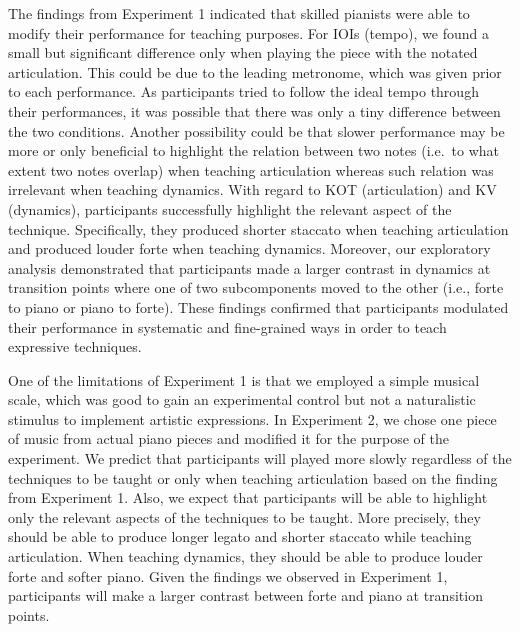\documentclass[
  english,
  man,floatsintext]{apa6}
\begin{document}
The findings from Experiment 1 indicated that skilled pianists were able to modify their performance for teaching purposes. For IOIs (tempo), we found a small but significant difference only when playing the piece with the notated articulation. This could be due to the leading metronome, which was given prior to each performance. As participants tried to follow the ideal tempo through their performances, it was possible that there was only a tiny difference between the two conditions. Another possibility could be that slower performance may be more or only beneficial to highlight the relation between two notes (i.e.~to what extent two notes overlap) when teaching articulation whereas such relation was irrelevant when teaching dynamics. With regard to KOT (articulation) and KV (dynamics), participants successfully highlight the relevant aspect of the technique. Specifically, they produced shorter staccato when teaching articulation and produced louder forte when teaching dynamics. Moreover, our exploratory analysis demonstrated that participants made a larger contrast in dynamics at transition points where one of two subcomponents moved to the other (i.e., forte to piano or piano to forte). These findings confirmed that participants modulated their performance in systematic and fine-grained ways in order to teach expressive techniques.

One of the limitations of Experiment 1 is that we employed a simple musical scale, which was good to gain an experimental control but not a naturalistic stimulus to implement artistic expressions. In Experiment 2, we chose one piece of music from actual piano pieces and modified it for the purpose of the experiment. We predict that participants will played more slowly regardless of the techniques to be taught or only when teaching articulation based on the finding from Experiment 1. Also, we expect that participants will be able to highlight only the relevant aspects of the techniques to be taught. More precisely, they should be able to produce longer legato and shorter staccato while teaching articulation. When teaching dynamics, they should be able to produce louder forte and softer piano. Given the findings we observed in Experiment 1, participants will make a larger contrast between forte and piano at transition points.
\end{document}
